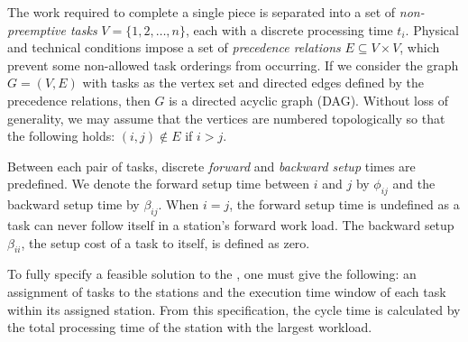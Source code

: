 The work required to complete a single piece is separated into
a set of \emph{non-preemptive tasks} $V=\{1,2,\ldots,n\}$,
each with a discrete processing time $t_i$.
Physical and technical conditions impose a set of 
\emph{precedence relations} $E\subseteq V\times V$,
which prevent some non-allowed task orderings from occurring.
If we consider the graph $G=(V,E)$ with tasks as the vertex set
and directed edges defined by the precedence relations,
then $G$ is a directed acyclic graph (DAG).	
Without loss of generality, we may assume that the vertices
are numbered topologically so that the following holds:
$(i,j) \notin E$ if $i>j$.

Between each pair of tasks, discrete
\emph{forward} and \emph{backward setup} times
are predefined.
We denote the forward setup time between $i$ and $j$
by $\phi_{ij}$ and the backward setup time
by $\beta_{ij}$.
When $i=j$, the forward setup time is undefined
as a task can never follow itself in a station's
forward work load.
The backward setup $\beta_{ii}$, \ie the setup cost
of a task to itself, is defined as zero.

To fully specify a feasible solution to the ,
one must give the following:
an assignment of tasks to the stations
and the execution time window of each task within
its assigned station.
From this specification, the cycle time is calculated by
the total processing time of the station with the
largest workload.

